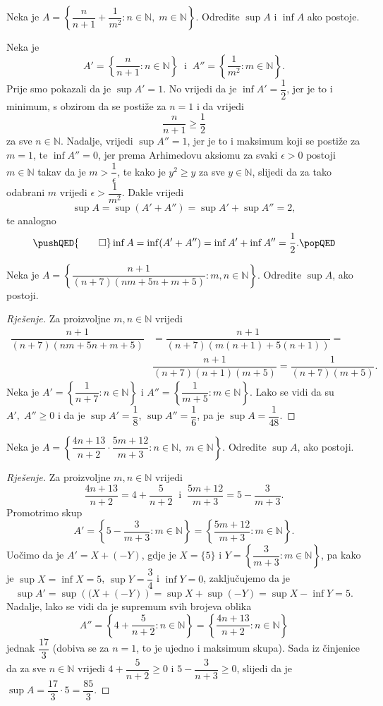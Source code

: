 \begin{exercise}
Neka je $A=\left\{\dfrac{n}{n+1}+\dfrac{1}{m^2} : n\in \mathbb{N},\; m\in \mathbb{N}\right\}$. Odredite $\sup{A}$ i $\inf{A}$ ako postoje.
\end{exercise}
\begin{proof*}
Neka je $$A'=\left\{\dfrac{n}{n+1} : n\in \mathbb{N}\right\}\;\;\text{i}\;\;A''=\left\{\dfrac{1}{m^2} : m\in \mathbb{N}\right\}.$$ Prije smo pokazali da je $\sup{A'}=1$. No vrijedi da je $\inf{A'}=\dfrac{1}{2}$, jer je to i minimum, s obzirom da se postiže za $n=1$ i da vrijedi $$\dfrac{n}{n+1}\geq\dfrac{1}{2}$$ za sve $n\in \mathbb{N}$. Nadalje, vrijedi $\sup{A''}=1$, jer je to i maksimum koji se postiže za $m=1$, te $\inf{A''}=0$, jer prema Arhimedovu aksiomu za svaki $\epsilon>0$ postoji $m\in \mathbb{N}$ takav da je $m>\dfrac{1}{\epsilon}$, te kako je $y^2\geq y$ za sve $y\in \mathbb{N}$, slijedi da za tako odabrani $m$ vrijedi $\epsilon>\dfrac{1}{m^2}$. Dakle vrijedi $$\sup{A}=\sup(A'+A'')=\sup{A'}+\sup{A''}=2,$$ 
te analogno \[\pushQED{\qed}
\inf{A}=\inf(A'+A'')=\inf{A'}+\inf{A''}=\dfrac{1}{2}.\qedhere
\popQED
\]
\end{proof*}
\begin{exercise}
Neka je $A=\left\{\dfrac{n+1}{(n+7)(nm+5n+m+5)} : m, n\in \mathbb{N}\right\}$. Odredite $\sup{A}$, ako postoji.
\end{exercise}
\begin{proof}[Rješenje]
Za proizvoljne $m, n\in \mathbb{N}$ vrijedi
\begin{align*}
\dfrac{n+1}{(n+7)(nm+5n+m+5)}&=\dfrac{n+1}{(n+7)(m(n+1)+5(n+1))}=\\
&\dfrac{n+1}{(n+7)(n+1)(m+5)}=\dfrac{1}{(n+7)(m+5)}.
\end{align*}
Neka je $A'=\left\{\dfrac{1}{n+7} : n\in \mathbb{N}\right\}$ i $A''=\left\{\dfrac{1}{m+5} : m\in \mathbb{N}\right\}$. Lako se vidi da su $A',\; A''\geq 0$ i da je $\sup{A'}=\dfrac{1}{8}$, $\sup{A''}=\dfrac{1}{6}$, pa je $\sup{A}=\dfrac{1}{48}$.
\end{proof}
\begin{exercise}
Neka je $A=\left\{\dfrac{4n+13}{n+2}\cdot \dfrac{5m+12}{m+3} : n\in \mathbb{N},\; m\in \mathbb{N}\right\}$. Odredite $\sup{A}$, ako postoji.
\end{exercise}
\begin{proof}[Rješenje]
Za proizvoljne $m, n\in \mathbb{N}$ vrijedi $$\dfrac{4n+13}{n+2}=4+\dfrac{5}{n+2}\;\;\text{i}\;\;\dfrac{5m+12}{m+3}=5-\dfrac{3}{m+3}.$$
Promotrimo skup 
$$A'=\left\{5-\dfrac{3}{m+3} : m\in \mathbb{N}\right\}=\left\{\dfrac{5m+12}{m+3} : m\in \mathbb{N}\right\}.$$
Uočimo da je $A'=X+(-Y)$, gdje je $X=\{5\}$ i $Y=\left\{\dfrac{3}{m+3} : m\in \mathbb{N}\right\}$, pa kako je $\sup{X}=\inf{X}=5$, $\sup{Y}=\dfrac{3}{4}$ i $\inf{Y}=0$, zaključujemo da je $$\sup{A'}=\sup\left((X+(-Y)\right)=\sup{X}+\sup(-Y)=\sup{X}-\inf{Y}=5.$$ Nadalje, lako se vidi da je supremum svih brojeva oblika $$A''=\left\{4+\dfrac{5}{n+2} : n\in \mathbb{N}\right\}=\left\{\dfrac{4n+13}{n+2} : n\in \mathbb{N}\right\}$$ jednak $\dfrac{17}{3}$ (dobiva se za $n=1$, to je ujedno i maksimum skupa). Sada iz činjenice da za sve $n\in \mathbb{N}$ vrijedi $4+\dfrac{5}{n+2}\geq 0$ i $5-\dfrac{3}{n+3}\geq 0$, slijedi da je $\sup{A}=\dfrac{17}{3}\cdot 5=\dfrac{85}{3}$.
\end{proof}
